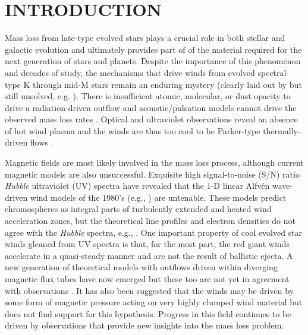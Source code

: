 \documentclass[iop]{emulateapj}
\begin{document}

\section{INTRODUCTION}

Mass loss from late-type evolved stars plays a crucial role in both stellar and galactic evolution and ultimately provides part of of the material required for the next generation of stars and planets. Despite the importance of this phenomenon and decades of study, the mechanisms that drive winds from evolved spectral-type K through mid-M stars remain an enduring mystery (clearly laid out by \cite{1985ASSL..117..229H} but still unsolved, e.g.
\citealt{2009AIPC.1094..267C}). There is insufficient atomic, molecular, or dust opacity to drive a radiation-driven outflow and acoustic/pulsation models cannot drive the observed mass loss rates \citep{1995ApJ...442L..61S}. Optical and ultraviolet observations reveal an absence of hot wind plasma and the winds are thus too cool to be Parker-type thermally-driven flows \cite[e.g.][]{1979ApJ...229L..27L,1981ApJ...250..293A}. 

Magnetic fields are most likely involved in the mass loss process, although current magnetic models are also unsuccessful. Exquisite high signal-to-noise (S/N) ratio \textit{Hubble} ultraviolet (UV) spectra have revealed that the 1-D linear Alfv\'en wave-driven wind models of the 1980’s (e.g., \citealt{1980ApJ...242..260H}) are untenable. These models predict chromospheres as integral parts of turbulently extended and heated wind acceleration zones, but the theoretical line profiles and electron densities do not agree with the \textit{Hubble} spectra, e.g., \cite{1998ApJ...494..828J}. One important property of cool evolved star winds gleaned from UV spectra is that, for the most part, the red giant winds accelerate in a quasi-steady manner and are not the result of ballistic ejecta. A new generation of theoretical models with outflows driven within diverging magnetic flux tubes have now emerged \citep{2006MNRAS.368.1145F, 2007ApJ...659.1592S} but these too are not yet in agreement with observations \citep{2009AIPC.1094..267C}. It has also been suggested that the winds may be driven by some form of magnetic pressure acting on very highly clumped wind material \citep{2008AJ....136.1964E} but \cite{2010ApJ...720.1767H} does not find support for this hypothesis. Progress in this field continues to be driven by observations that provide new insights into the mass loss problem.
\end{document}
